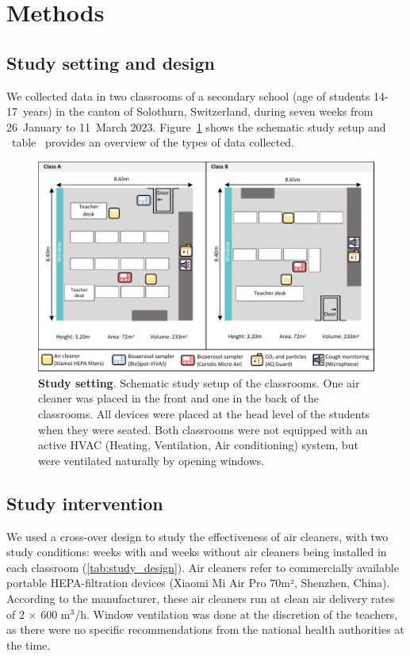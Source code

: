 \documentclass[fleqn,11pt]{wlscirep}
\begin{document}
\newpage

\section{Methods}

\subsection{Study setting and design} 

\noindent We collected data in two classrooms of a secondary school (age of students 14-17~years) in the canton of Solothurn, Switzerland, during seven weeks from 26~January to 11~March 2023. Figure~\ref{fig:study-setup} shows the schematic study setup and \supp~table~ provides an overview of the types of data collected.

\begin{figure}[!htpb]
    \centering
    \includegraphics{../study_setting.pdf}
    \caption{\textbf{Study setting}. Schematic study setup of the classrooms. One air cleaner was placed in the front and one in the back of the classrooms. All devices were placed at the head level of the students when they were seated. Both classrooms were not equipped with an active HVAC (Heating, Ventilation, Air conditioning) system, but were ventilated naturally by opening windows. }
    \label{fig:study-setup}
\end{figure}

\subsection{Study intervention} 

\noindent We used a cross-over design to study the effectiveness of air cleaners, with two study conditions: weeks with and weeks without air cleaners being installed in each classroom (\cref{tab:study_design}). Air cleaners refer to commercially available portable HEPA-filtration devices (Xiaomi Mi Air Pro 70m², Shenzhen, China). According to the manufacturer, these air cleaners run at clean air delivery rates of 2$\,\times\,$600 m$^{3}$/h. %
Window ventilation was done at the discretion of the teachers, as there were no specific recommendations from the national health authorities at the time.
\end{document}
